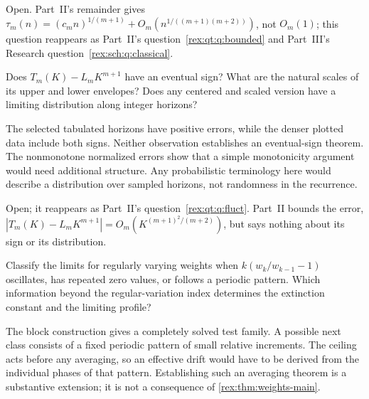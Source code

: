 \begin{writenote}
Open. Part~II's remainder gives
$\tau_m(n)=(c_mn)^{1/(m+1)}+O_m(n^{1/((m+1)(m+2))})$, not $O_m(1)$; this
question reappears as Part~II's question~\ref{rex:qt:q:bounded} and
Part~III's Research question~\ref{rex:sch:q:classical}.
\end{writenote}

\begin{question}\label{rex:q:fluct}
Does $T_m(K)-L_mK^{m+1}$ have an eventual sign? What are the natural
scales of its upper and lower envelopes? Does any centered and scaled
version have a limiting distribution along integer horizons?
\end{question}

The selected tabulated horizons have positive errors, while the denser
plotted data include both signs. Neither observation establishes an
eventual-sign theorem. The nonmonotone normalized errors show that a
simple monotonicity argument would need additional structure. Any probabilistic terminology here would describe a
distribution over sampled horizons, not randomness in the recurrence.

\begin{writenote}
Open; it reappears as Part~II's question~\ref{rex:qt:q:fluct}. Part~II
bounds the error, $|T_m(K)-L_mK^{m+1}|=O_m(K^{(m+1)^2/(m+2)})$, but says
nothing about its sign or its distribution.
\end{writenote}

\begin{question}\label{rex:q:schedules}
Classify the limits for regularly varying weights when
$k(w_k/w_{k-1}-1)$ oscillates, has repeated zero values, or follows a
periodic pattern. Which information beyond the regular-variation
index determines the extinction constant and the limiting profile?
\end{question}

The block construction gives a completely solved test family. A
possible next class consists of a fixed periodic pattern of small
relative increments. The ceiling acts before any averaging, so an
effective drift would have to be derived from the individual phases
of that pattern. Establishing such an averaging theorem is a
substantive extension; it is not a consequence of
\cref{rex:thm:weights-main}.

